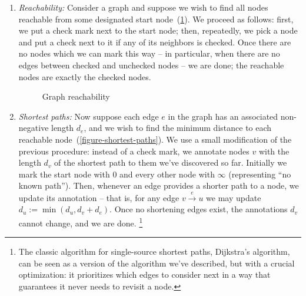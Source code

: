 \begin{enumerate}
\item \emph{Reachability:}
%
Consider a graph and suppose we wish to find all nodes reachable from some
designated start node~(\cref{figure-reachability}). We proceed as follows:
first, we put a check mark next to the start node; then, repeatedly, we pick a
node and put a check next to it if any of its neighbors is checked. Once there
are no nodes which we can mark this way -- in particular, when there are no
edges between checked and unchecked nodes -- we are done; the reachable nodes
are exactly the checked nodes.


\begin{figure}[pth]
  \XXX
  \caption{Graph reachability}
  \label{figure-reachability}
\end{figure}

\item \emph{Shortest paths:}
%
Now suppose each edge $e$ in the graph has an associated non-negative length
$d_e$, and we wish to find the minimum distance to each reachable
node~(\cref{figure-shortest-paths}). We use a small modification of the previous
procedure: instead of a check mark, we annotate nodes $v$ with the length $d_v$
of the shortest path to them we've discovered so far. Initially we mark the
start node with 0 and every other node with $\infty$ (representing ``no known
path'').
%
%
%
Then, whenever an edge provides a shorter path to a node, we update its
annotation -- that is, for any edge $v \xrightarrow{e} u$ we may update $d_u :=
\min(d_u, d_v + d_e)$.
%
Once no shortening edges exist, the annotations $d_v$ cannot change, and we are done.%
%
%
\footnote{The classic algorithm for single-source shortest paths, Dijkstra's
  algorithm, can be seen as a version of the algorithm we've described, but with
  a crucial optimization: it prioritizes which edges to consider next in a
  way that guarantees it never needs to revisit a node.}


\end{enumerate}
